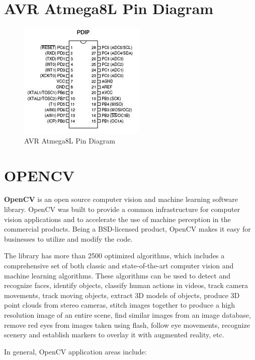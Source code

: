 \documentclass[12pt, a4paper]{article}
\begin{document}
\begin{appendices}
\section{AVR Atmega8L Pin Diagram}
\begin{figure}[htp]
\centering
\includegraphics[scale=1.00]{avr.jpeg}
\caption{AVR Atmega8L Pin Diagram}
\label{}
\end{figure}
\newpage
\section{OPENCV}
\textbf{\ac{OpenCV}} is an open source computer vision and machine learning software library. \ac{OpenCV} was built to provide a common infrastructure for computer vision applications and to accelerate the use of machine perception in the commercial products. Being a BSD-licensed product, \ac{OpenCV} makes it easy for businesses to utilize and modify the code.

The library has more than 2500 optimized algorithms, which includes a comprehensive set of both classic and state-of-the-art computer vision and machine learning algorithms. These algorithms can be used to detect and recognize faces, identify objects, classify human actions in videos, track camera movements, track moving objects, extract \ac{3D} models of objects, produce \ac{3D} point clouds from stereo cameras, stitch images together to produce a high resolution image of an entire scene, find similar images from an image database, remove red eyes from images taken using flash, follow eye movements, recognize scenery and establish markers to overlay it with augmented reality, etc.

In general, \ac{OpenCV} application areas include:


\end{appendices}
\end{document}
